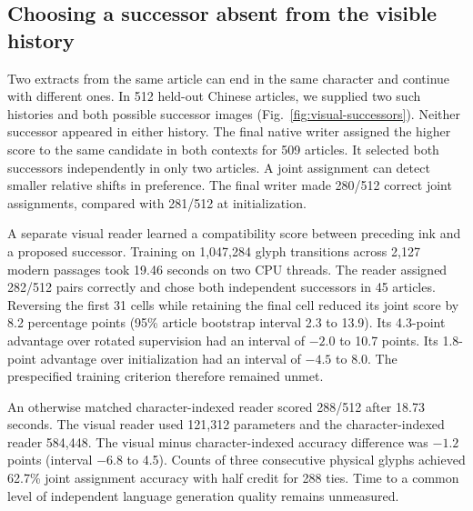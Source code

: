 \subsection*{Choosing a successor absent from the visible history}
Two extracts from the same article can end in the same character and continue
with different ones. In 512 held-out Chinese articles, we supplied two such
histories and both possible successor images (Fig.~\ref{fig:visual-successors}).
Neither successor appeared in either history. The final native writer assigned
the higher score to the same candidate in both contexts for 509 articles. It
selected both successors independently in only two articles. A joint assignment
can detect smaller relative shifts in preference. The final writer made 280/512
correct joint assignments, compared with 281/512 at initialization.

A separate visual reader learned a compatibility score between preceding ink
and a proposed successor. Training on 1,047,284 glyph transitions across 2,127
modern passages took 19.46 seconds on two CPU threads. The reader assigned
282/512 pairs correctly and chose both independent successors in 45 articles.
Reversing the first 31 cells while retaining the final cell reduced its joint
score by 8.2 percentage points (95\% article bootstrap interval 2.3 to 13.9).
Its 4.3-point advantage over rotated supervision had an interval of $-2.0$ to
10.7 points. Its 1.8-point advantage over initialization had an interval of
$-4.5$ to 8.0. The prespecified training criterion therefore remained unmet.

An otherwise matched character-indexed reader scored 288/512 after 18.73
seconds. The visual reader used 121,312 parameters and the character-indexed
reader 584,448. The visual minus character-indexed accuracy difference was
$-1.2$ points (interval $-6.8$ to 4.5). Counts of three consecutive
physical glyphs achieved 62.7\% joint assignment accuracy with half
credit for 288 ties. Time to a common level of independent language
generation quality remains unmeasured.

